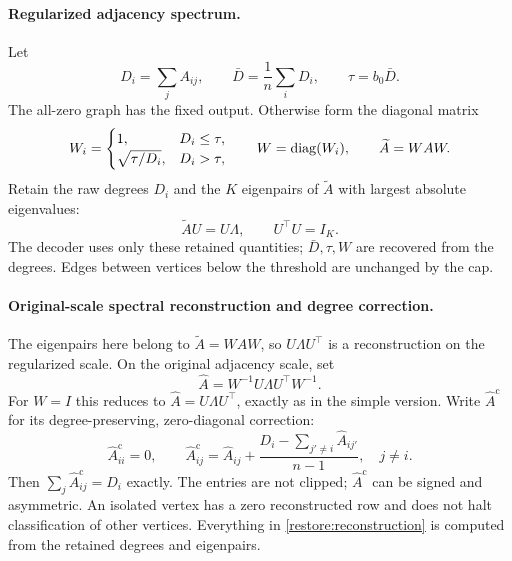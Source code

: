 \paragraph{Regularized adjacency spectrum.}
Let
\[
 D_i=\sum_jA_{ij},\qquad \bar D=\frac1n\sum_iD_i,
 \qquad \tau=b_0\bar D.
\]
The all-zero graph has the fixed output. Otherwise form the diagonal
matrix
\[
 W_i=\begin{cases}
 1,&D_i\le\tau,\\
 \sqrt{\tau/D_i},&D_i>\tau,
 \end{cases}
 \qquad W=\operatorname{diag}(W_i),\qquad \widetilde A=WAW.
\]
Retain the raw degrees $D_i$ and the $K$ eigenpairs of $\widetilde A$
with largest absolute eigenvalues:
\[
 \widetilde AU=U\Lambda,\qquad U^\top U=I_K.
\]
The decoder uses only these retained quantities; $\bar D,\tau,W$ are
recovered from the degrees. Edges between vertices below the threshold
are unchanged by the cap.

\paragraph{Original-scale spectral reconstruction and degree correction.}
The eigenpairs here belong to $\widetilde A=WAW$, so
$U\Lambda U^\top$ is a reconstruction on the regularized scale.
On the original adjacency scale, set
\[
 \widehat A=W^{-1}U\Lambda U^\top W^{-1}.
\]
For $W=I$ this reduces to $\widehat A=U\Lambda U^\top$, exactly
as in the simple version. Write $\widehat A^{\mathrm{c}}$ for its
degree-preserving, zero-diagonal correction:
\begin{equation}\label{restore:reconstruction}
 \widehat A^{\mathrm{c}}_{ii}=0,\qquad
 \widehat A^{\mathrm{c}}_{ij}=\widehat A_{ij}
      +\frac{D_i-\sum_{j'\ne i}\widehat A_{ij'}}{n-1},\quad j\ne i.
\end{equation}
Then $\sum_j\widehat A^{\mathrm{c}}_{ij}=D_i$ exactly. The entries are not clipped;
$\widehat A^{\mathrm{c}}$ can be signed and asymmetric. An isolated vertex has a
zero reconstructed row and does not halt classification of other
vertices. Everything in \eqref{restore:reconstruction} is computed
from the retained degrees and eigenpairs.

